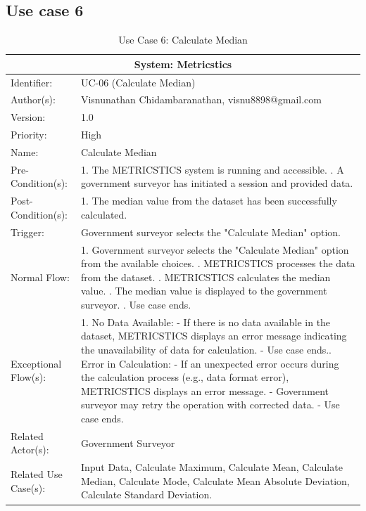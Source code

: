 
\begin{table}[h]
\subsection*{Use case 6}
\begin{tabular}{ | p{4cm} | p{10cm} | }
 \hline
 \multicolumn{2}{|c|}{System: Metricstics} \\
 \hline
 Identifier: & UC-06 (Calculate Median)  \\
 \hline
 Author(s): & Visnunathan Chidambaranathan, visnu8898@gmail.com     \\
 \hline
 Version: & 1.0	\\
 \hline
 Priority: & High	\\
 \hline
 Name: & Calculate Median   \\
 \hline
 Pre-Condition(s):  & {1. The METRICSTICS system is running and accessible. \newline 2. A government surveyor has initiated a session and provided data.  }\\
 \hline
 Post-Condition(s):  & {1. The median value from the dataset has been successfully calculated. }\\
 \hline
 Trigger: & Government surveyor selects the "Calculate Median" option. \\
 \hline
 Normal Flow:  & {1. Government surveyor selects the "Calculate Median" option from the available choices. \newline 2. METRICSTICS processes the data from the dataset. \newline 3. METRICSTICS calculates the median value. \newline 4. The median value is displayed to the government surveyor. \newline 5. Use case ends.}\\
 \hline
 Exceptional Flow(s):  & {1. No Data Available: \newline
   - If there is no data available in the dataset, METRICSTICS displays an error message indicating the unavailability of data for calculation.\newline
   - Use case ends.\newline
   2. Error in Calculation: \newline
   - If an unexpected error occurs during the calculation process (e.g., data format error), METRICSTICS displays an error message. \newline
   - Government surveyor may retry the operation with corrected data. \newline
   - Use case ends.}\\
 \hline
 Related Actor(s): & Government Surveyor\\
 \hline
 Related Use Case(s): & Input Data, Calculate Maximum, Calculate Mean, Calculate Median, Calculate Mode, Calculate Mean Absolute Deviation, Calculate Standard Deviation.\\
 \hline
 \end{tabular}
\renewcommand{\thetable}{\arabic{table}}
\caption{Use Case 6: Calculate Median}
\label{tab:table1}
\end{table}

